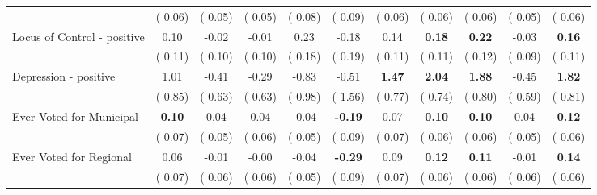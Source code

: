 \begin{tabular}{l c c c c c c c c c c}
& (     0.06) & (     0.05) & (     0.05) & (     0.08) & (     0.09) & (     0.06) & (     0.06) & (     0.06) & (     0.05) & (     0.06) \\
Locus of Control - positive &      0.10 &     -0.02 &     -0.01 &      0.23 &     -0.18 &      0.14 & \textbf{      0.18 } & \textbf{      0.22 } &     -0.03 & \textbf{     0.16} \\
& (     0.11) & (     0.10) & (     0.10) & (     0.18) & (     0.19) & (     0.11) & (     0.11) & (     0.12) & (     0.09) & (     0.11) \\
Depression - positive &      1.01 &     -0.41 &     -0.29 &     -0.83 &     -0.51 & \textbf{      1.47 } & \textbf{      2.04 } & \textbf{      1.88 } &     -0.45 & \textbf{     1.82} \\
& (     0.85) & (     0.63) & (     0.63) & (     0.98) & (     1.56) & (     0.77) & (     0.74) & (     0.80) & (     0.59) & (     0.81) \\
Ever Voted for Municipal & \textbf{      0.10 } &      0.04 &      0.04 &     -0.04 & \textbf{     -0.19 } &      0.07 & \textbf{      0.10 } & \textbf{      0.10 } &      0.04 & \textbf{     0.12} \\
& (     0.07) & (     0.05) & (     0.06) & (     0.05) & (     0.09) & (     0.07) & (     0.06) & (     0.06) & (     0.05) & (     0.06) \\
Ever Voted for Regional &      0.06 &     -0.01 &     -0.00 &     -0.04 & \textbf{     -0.29 } &      0.09 & \textbf{      0.12 } & \textbf{      0.11 } &     -0.01 & \textbf{     0.14} \\
& (     0.07) & (     0.06) & (     0.06) & (     0.05) & (     0.09) & (     0.07) & (     0.06) & (     0.06) & (     0.06) & (     0.06) \\
\bottomrule
\end{tabular}
